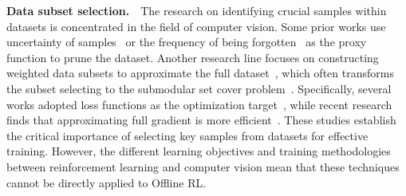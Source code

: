\textbf{Data subset selection.}\ \ The research on identifying crucial samples within datasets is concentrated in the field of computer vision.
Some prior works use uncertainty of samples~\cite{coleman2019selection,paul2021deep} or the frequency of being forgotten~\cite{toneva2018empirical} as the proxy function to prune the dataset.
Another research line focuses on constructing weighted data subsets to approximate the full dataset~\cite{feldman2020core}, which often transforms the subset selecting to the submodular set cover problem~\cite{wei2015submodularity,kaushal2019learning}.
Specifically, several works adopted loss functions as the optimization target~\cite{lucic2018training,campbell2018bayesian}, while recent research finds that approximating full gradient is more efficient~\cite{mirzasoleiman2020coresets, killamsetty2021grad,killamsetty2021glister,killamsetty2021retrieve}.
These studies establish the critical importance of selecting key samples from datasets for effective training. However, the different learning objectives and training methodologies between reinforcement learning and computer vision mean that these techniques cannot be directly applied to Offline RL.